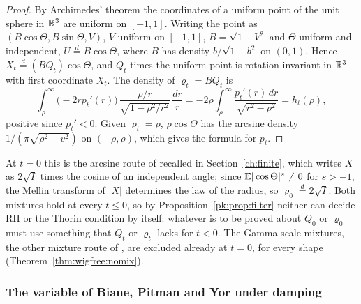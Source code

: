 \begin{proof}
By Archimedes' theorem the coordinates of a uniform point of the unit sphere in $\mathbb{R}^3$ are uniform on $[-1,1]$. Writing the point as $(B\cos\Theta,B\sin\Theta,V)$, $V$ uniform on $[-1,1]$, $B=\sqrt{1-V^2}$ and $\Theta$ uniform and independent, $U\overset d=B\cos\Theta$, where $B$ has density $b/\sqrt{1-b^2}$ on $(0,1)$. Hence $X_t\overset d=(BQ_t)\cos\Theta$, and $Q_t$ times the uniform point is rotation invariant in $\mathbb{R}^3$ with first coordinate $X_t$. The density of $\varrho_t=BQ_t$ is
\[
\int_\rho^\infty\big(-2rp_t'(r)\big)\,\frac{\rho/r}{\sqrt{1-\rho^2/r^2}}\,\frac{dr}r=-2\rho\int_\rho^\infty\frac{p_t'(r)\,dr}{\sqrt{r^2-\rho^2}}=h_t(\rho),
\]
positive since $p_t'<0$. Given $\varrho_t=\rho$, $\rho\cos\Theta$ has the arcsine density $1/(\pi\sqrt{\rho^2-v^2})$ on $(-\rho,\rho)$, which gives the formula for $p_t$.
\end{proof}

At $t=0$ this is the arcsine route of \cite[Chapter 12]{P26} recalled in Section~\ref{ch:finite}, which writes $X$ as $2\sqrt I$ times the cosine of an independent angle; since $\mathbb{E}|\cos\Theta|^s\ne0$ for $s>-1$, the Mellin transform of $|X|$ determines the law of the radius, so $\varrho_0\overset d=2\sqrt I$. Both mixtures hold at every $t\le0$, so by Proposition~\ref{pk:prop:filter} neither can decide RH or the Thorin condition by itself: whatever is to be proved about $Q_0$ or $\varrho_0$ must use something that $Q_t$ or $\varrho_t$ lacks for $t<0$. The Gamma scale mixtures, the other mixture route of \cite[Section 12.6]{P26}, are excluded already at $t=0$, for every shape (Theorem~\ref{thm:wigfree:nomix}).

\subsubsection{The variable of Biane, Pitman and Yor under damping}\label{pk:sec:bpy}

